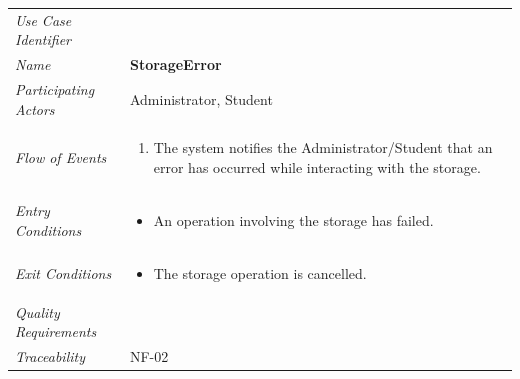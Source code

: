 \documentclass[12pt,letterpaper]{article}
\begin{document}
\begin{center}
	\begin{tabu} to 
		\toprule
		Use Case Identifier & \storageerror{} \\
		Name & {\bf StorageError} \\
		Participating Actors & Administrator, Student \\
		Flow of Events & 
		\begin{minipage}[t]{\linewidth}
		    \begin{enumerate}
			    \item The system notifies the Administrator/Student that an error has occurred while interacting with the storage.
			\end{enumerate}
		\end{minipage} \\

		Entry Conditions &
		\begin{minipage}[t]{\linewidth}
			\begin{itemize}
			    \item An operation involving the storage has failed.
	        \end{itemize}
		\end{minipage} \\

		Exit Conditions &
		\begin{minipage}[t]{\linewidth}
			\begin{itemize}
			    \item The storage operation is cancelled.
	        \end{itemize}
		\end{minipage} \\

		Quality Requirements & \\

		Traceability & NF-02 \\
		\toprule
	\end{tabu}
\end{center}
\end{document}
